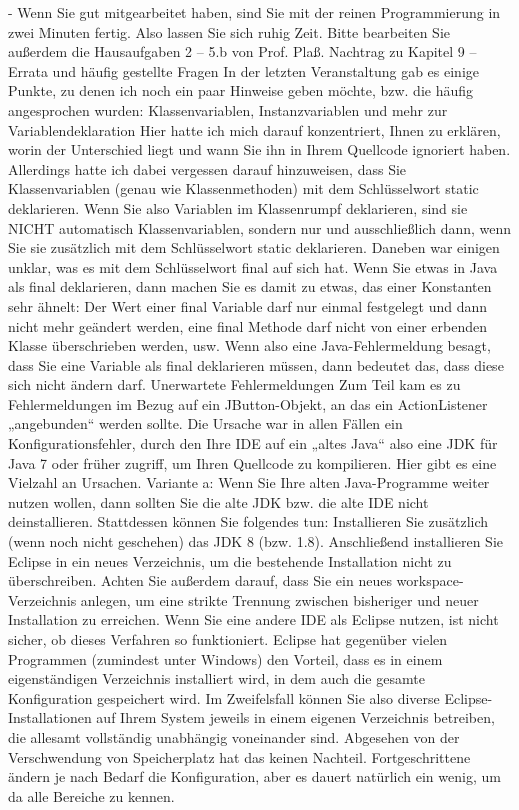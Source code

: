 -	Wenn Sie gut mitgearbeitet haben, sind Sie mit der reinen Programmierung in zwei Minuten fertig. Also lassen Sie sich ruhig Zeit.
Bitte bearbeiten Sie außerdem die Hausaufgaben 2 – 5.b von Prof. Plaß.
Nachtrag zu Kapitel 9 – Errata und häufig gestellte Fragen
In der letzten Veranstaltung gab es einige Punkte, zu denen ich noch ein paar Hinweise geben möchte, bzw. die häufig angesprochen wurden:
Klassenvariablen, Instanzvariablen und mehr zur Variablendeklaration
Hier hatte ich mich darauf konzentriert, Ihnen zu erklären, worin der Unterschied liegt und wann Sie ihn in Ihrem Quellcode ignoriert haben. Allerdings hatte ich dabei vergessen darauf hinzuweisen, dass Sie Klassenvariablen (genau wie Klassenmethoden) mit dem Schlüsselwort static deklarieren.
Wenn Sie also Variablen im Klassenrumpf deklarieren, sind sie NICHT automatisch Klassenvariablen, sondern nur und ausschließlich dann, wenn Sie sie zusätzlich mit dem Schlüsselwort static deklarieren.
Daneben war einigen unklar, was es mit dem Schlüsselwort final auf sich hat. Wenn Sie etwas in Java als final deklarieren, dann machen Sie es damit zu etwas, das einer Konstanten sehr ähnelt: Der Wert einer final Variable darf nur einmal festgelegt und dann nicht mehr geändert werden, eine final Methode darf nicht von einer erbenden Klasse überschrieben werden, usw.
Wenn also eine Java-Fehlermeldung besagt, dass Sie eine Variable als final deklarieren müssen, dann bedeutet das, dass diese sich nicht ändern darf.
Unerwartete Fehlermeldungen
Zum Teil kam es zu Fehlermeldungen im Bezug auf ein JButton-Objekt, an das ein ActionListener „angebunden“ werden sollte. Die Ursache war in allen Fällen ein Konfigurationsfehler, durch den Ihre IDE auf ein „altes Java“ also eine JDK für Java 7 oder früher zugriff, um Ihren Quellcode zu kompilieren. Hier gibt es eine Vielzahl an Ursachen.
Variante a: Wenn Sie Ihre alten Java-Programme weiter nutzen wollen, dann sollten Sie die alte JDK bzw. die alte IDE nicht deinstallieren. Stattdessen können Sie folgendes tun: Installieren Sie zusätzlich (wenn noch nicht geschehen) das JDK 8 (bzw. 1.8). Anschließend installieren Sie Eclipse in ein neues Verzeichnis, um die bestehende Installation nicht zu überschreiben. Achten Sie außerdem darauf, dass Sie ein neues workspace-Verzeichnis anlegen, um eine strikte Trennung zwischen bisheriger und neuer Installation zu erreichen. Wenn Sie eine andere IDE als Eclipse nutzen, ist nicht sicher, ob dieses Verfahren so funktioniert. Eclipse hat gegenüber vielen Programmen (zumindest unter Windows) den Vorteil, dass es in einem eigenständigen Verzeichnis installiert wird, in dem auch die gesamte Konfiguration gespeichert wird. Im Zweifelsfall können Sie also diverse Eclipse-Installationen auf Ihrem System jeweils in einem eigenen Verzeichnis betreiben, die allesamt vollständig unabhängig voneinander sind. Abgesehen von der Verschwendung von Speicherplatz hat das keinen Nachteil. Fortgeschrittene ändern je nach Bedarf die Konfiguration, aber es dauert natürlich ein wenig, um da alle Bereiche zu kennen.
